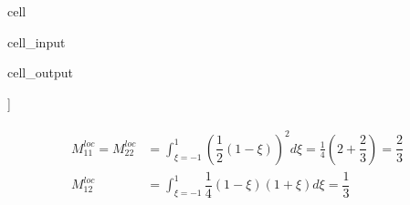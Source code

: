\documentclass[letterpaper,10pt,english]{jupyterBook}
\begin{document}
\begin{sphinxuseclass}{cell}\begin{sphinxVerbatimInput}

\begin{sphinxuseclass}{cell_input}
\begin{sphinxVerbatim}[commandchars=\\\{\}]
      
  \PYG{p}{[} \PYG{p}{[}   \PYG{p}{]}     \PYG{p}{]}

\end{sphinxVerbatim}

\end{sphinxuseclass}\end{sphinxVerbatimInput}
\begin{sphinxVerbatimOutput}

\begin{sphinxuseclass}{cell_output}
\begin{sphinxVerbatim}[commandchars=\\\{\}]
[0.         0.33333333 0.66666667 1.        ]
[[0 1]
 [1 2]
 [2 3]]
\end{sphinxVerbatim}

\end{sphinxuseclass}\end{sphinxVerbatimOutput}

\end{sphinxuseclass}\begin{equation*}
\begin{split}\begin{aligned}
  M_{11}^{loc} = M_{22}^{loc} & = \int_{\xi=-1}^{1} \left( \dfrac{1}{2} \left( 1- \xi \right)\right)^2 d \xi = \frac{1}{4} \left( 2 + \dfrac{2}{3} \right) = \dfrac{2}{3} \\
  M_{12}^{loc} & = \int_{\xi=-1}^{1} \dfrac{1}{4} \left( 1 - \xi \right) \left( 1 + \xi \right) d \xi = \dfrac{1}{3} 
\end{aligned}\end{split}
\end{equation*}
\end{document}

